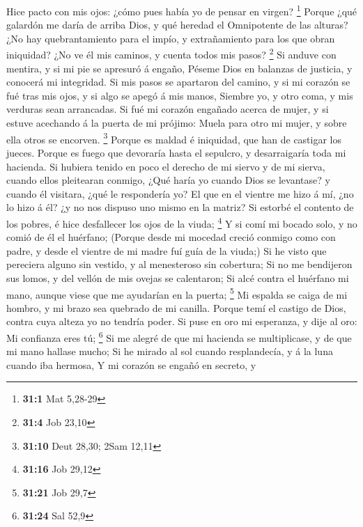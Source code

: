  Hice pacto con mis ojos: ¿cómo pues había yo de pensar en
virgen? \footnote{\textbf{31:1} Mat 5,28-29}  Porque ¿qué
galardón me daría de arriba Dios, y qué heredad el Omnipotente de las
alturas?  ¿No hay quebrantamiento para el impío, y
extrañamiento para los que obran iniquidad?  ¿No ve él mis
caminos, y cuenta todos mis pasos? \footnote{\textbf{31:4} Job 23,10}
 Si anduve con mentira, y si mi pie se apresuró á engaño,
 Péseme Dios en balanzas de justicia, y conocerá mi
integridad.  Si mis pasos se apartaron del camino, y si mi
corazón se fué tras mis ojos, y si algo se apegó á mis manos,
 Siembre yo, y otro coma, y mis verduras sean arrancadas.
 Si fué mi corazón engañado acerca de mujer, y si estuve
acechando á la puerta de mi prójimo:  Muela para otro mi
mujer, y sobre ella otros se encorven. \footnote{\textbf{31:10} Deut
  28,30; 2Sam 12,11}  Porque es maldad é iniquidad, que han
de castigar los jueces.  Porque es fuego que devoraría
hasta el sepulcro, y desarraigaría toda mi hacienda.  Si
hubiera tenido en poco el derecho de mi siervo y de mi sierva, cuando
ellos pleitearan conmigo,  ¿Qué haría yo cuando Dios se
levantase? y cuando él visitara, ¿qué le respondería yo? 
El que en el vientre me hizo á mí, ¿no lo hizo á él? ¿y no nos dispuso
uno mismo en la matriz?  Si estorbé el contento de los
pobres, é hice desfallecer los ojos de la viuda; \footnote{\textbf{31:16}
  Job 29,12}  Y si comí mi bocado solo, y no comió de él el
huérfano;  (Porque desde mi mocedad creció conmigo como con
padre, y desde el vientre de mi madre fuí guía de la viuda;)
 Si he visto que pereciera alguno sin vestido, y al
menesteroso sin cobertura;  Si no me bendijeron sus lomos,
y del vellón de mis ovejas se calentaron;  Si alcé contra
el huérfano mi mano, aunque viese que me ayudarían en la puerta;
\footnote{\textbf{31:21} Job 29,7}  Mi espalda se caiga de
mi hombro, y mi brazo sea quebrado de mi canilla.  Porque
temí el castigo de Dios, contra cuya alteza yo no tendría poder.
 Si puse en oro mi esperanza, y dije al oro: Mi confianza
eres tú; \footnote{\textbf{31:24} Sal 52,9}  Si me alegré
de que mi hacienda se multiplicase, y de que mi mano hallase mucho;
 Si he mirado al sol cuando resplandecía, y á la luna
cuando iba hermosa,  Y mi corazón se engañó en secreto, y
